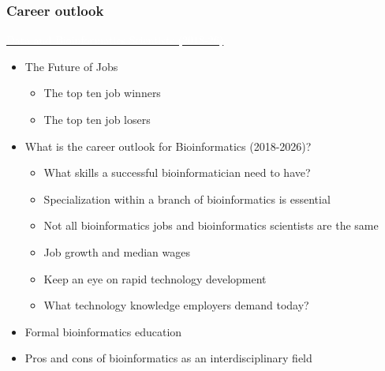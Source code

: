 \begin{frame}
  \frametitle{Career outlook}
  \begin{block}{\href{https://bioinformaticshome.com/blog/jobs_landscape_2018_2020.html}{\textcolor{white}{Data and Bioinformatics Scientists (2018-26)}}}
    \begin{itemize}
      \item The Future of Jobs
        \begin{itemize}
          \item The top ten job winners
          \item The top ten job losers
        \end{itemize}
      \item What is the career outlook for Bioinformatics (2018-2026)?
        \begin{itemize}
          \item What skills a successful bioinformatician need to have?
          \item Specialization within a branch of bioinformatics is essential
          \item Not all bioinformatics jobs and bioinformatics scientists are the same
          \item Job growth and median wages
          \item Keep an eye on rapid technology development
          \item What technology knowledge employers demand today?
        \end{itemize}
      \item Formal bioinformatics education
      \item Pros and cons of bioinformatics as an interdisciplinary field
    \end{itemize}
  \end{block}
\end{frame}

